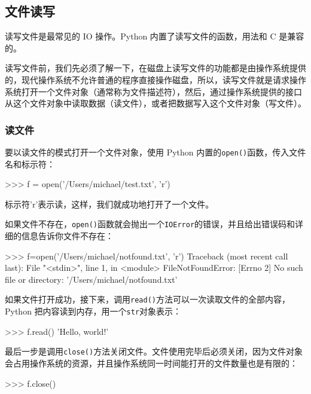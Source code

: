 \hypertarget{ux6587ux4ef6ux8bfbux5199}{%
\subsection{文件读写}\label{ux6587ux4ef6ux8bfbux5199}}

读写文件是最常见的 IO 操作。Python 内置了读写文件的函数，用法和 C
是兼容的。

读写文件前，我们先必须了解一下，在磁盘上读写文件的功能都是由操作系统提供的，现代操作系统不允许普通的程序直接操作磁盘，所以，读写文件就是请求操作系统打开一个文件对象（通常称为文件描述符），然后，通过操作系统提供的接口从这个文件对象中读取数据（读文件），或者把数据写入这个文件对象（写文件）。

\hypertarget{ux8bfbux6587ux4ef6}{%
\subsubsection{读文件}\label{ux8bfbux6587ux4ef6}}

要以读文件的模式打开一个文件对象，使用 Python
内置的\texttt{open()}函数，传入文件名和标示符：

\begin{pythoncode}
>>> f = open('/Users/michael/test.txt', 'r')
\end{pythoncode}

标示符'r'表示读，这样，我们就成功地打开了一个文件。

如果文件不存在，\texttt{open()}函数就会抛出一个\texttt{IOError}的错误，并且给出错误码和详细的信息告诉你文件不存在：

\begin{pythoncode}
>>> f=open('/Users/michael/notfound.txt', 'r')
Traceback (most recent call last):
  File "<stdin>", line 1, in <module>
FileNotFoundError: [Errno 2] No such file or directory: '/Users/michael/notfound.txt'
\end{pythoncode}

如果文件打开成功，接下来，调用\texttt{read()}方法可以一次读取文件的全部内容，Python
把内容读到内存，用一个\texttt{str}对象表示：

\begin{pythoncode}
>>> f.read()
'Hello, world!'
\end{pythoncode}

最后一步是调用\texttt{close()}方法关闭文件。文件使用完毕后必须关闭，因为文件对象会占用操作系统的资源，并且操作系统同一时间能打开的文件数量也是有限的：

\begin{pythoncode}
>>> f.close()
\end{pythoncode}

